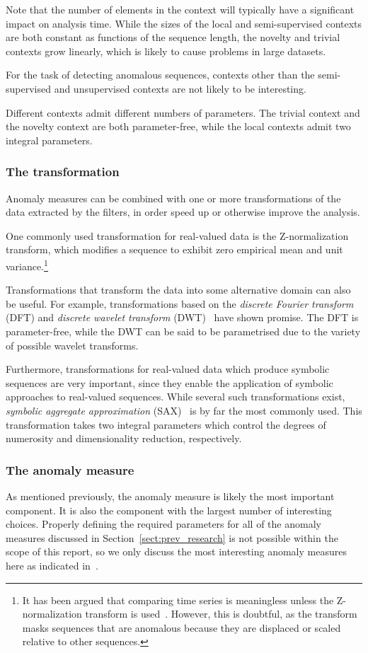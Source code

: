 Note that the number of elements in the context will typically have a significant impact on analysis time. While the sizes of the local and semi-supervised contexts are both constant as functions of the sequence length, the novelty and trivial contexts grow linearly, which is likely to cause problems in large datasets.

For the task of detecting anomalous sequences, contexts other than the semi-supervised and unsupervised contexts are not likely to be interesting.

Different contexts admit different numbers of parameters. The trivial context and the novelty context are both parameter-free, while the local contexts admit two integral parameters.

\subsubsection{The transformation}

Anomaly measures can be combined with one or more transformations of the data extracted by the filters, in order speed up or otherwise improve the analysis.

One commonly used transformation for real-valued data is the Z-normalization transform, which modifies a sequence to exhibit zero empirical mean and unit variance.\footnote{It has been argued that comparing time series is meaningless unless the Z-normalization transform is used~\cite{keogh5}. However, this is doubtful, as the transform masks sequences that are anomalous because they are displaced or scaled relative to other sequences.}

Transformations that transform the data into some alternative domain can also be useful. For example, transformations based on the \emph{discrete Fourier transform} (DFT) and \emph{discrete wavelet transform} (DWT)~\cite{fu} have shown promise. The DFT is parameter-free, while the DWT can be said to be parametrised due to the variety of possible wavelet transforms.

Furthermore, transformations for real-valued data which produce symbolic sequences are very important, since they enable the application of symbolic approaches to real-valued sequences. While several such transformations exist, \emph{symbolic aggregate approximation} (SAX)~\cite{sax} is by far the most commonly used. This transformation takes two integral parameters which control the degrees of numerosity and dimensionality reduction, respectively.

\subsubsection{The anomaly measure}
As mentioned previously, the anomaly measure is likely the most important component. It is also the component with the largest number of interesting choices. Properly defining the required parameters for all of the anomaly measures discussed in Section~\ref{sect:prev_research} is not possible within the scope of this report, so we only discuss the most interesting anomaly measures here as indicated in~\cite{chandola3}.

